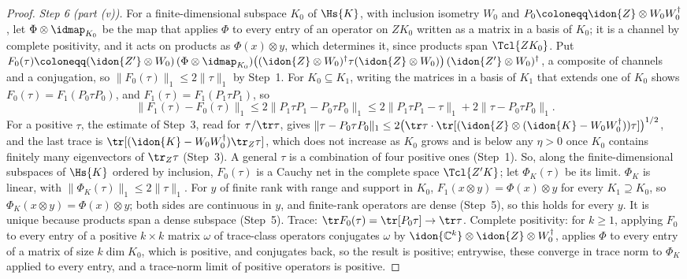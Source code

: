 \begin{proof}
\emph{Step 6 (part (v)).} For a finite-dimensional subspace $K_0$ of
$\Hs{K}$, with inclusion isometry $W_0$ and $P_0\coloneqq\idon{Z}\otimes
W_0W_0^{\dagger}$, let $\Phi\otimes\idmap_{K_0}$ be the map that applies
$\Phi$ to every entry of an operator on $ZK_0$ written as a matrix in a basis
of $K_0$; it is a channel by complete positivity, and it acts on products as
$\Phi(x)\otimes y$, which determines it, since products span $\Tcl{ZK_0}$.
Put $F_0(\tau)\coloneqq(\idon{Z'}\otimes W_0)\,(\Phi\otimes\idmap_{K_0})
\big((\idon{Z}\otimes W_0)^{\dagger}\tau(\idon{Z}\otimes W_0)\big)\,
(\idon{Z'}\otimes W_0)^{\dagger}$, a composite of channels and a
conjugation, so $\|F_0(\tau)\|_1\le2\|\tau\|_1$ by Step~1. For
$K_0\subseteq K_1$, writing the matrices in a basis of $K_1$ that extends one
of $K_0$ shows $F_0(\tau)=F_1(P_0\tau P_0)$, and $F_1(\tau)=F_1(P_1\tau P_1)$,
so
\begin{equation*}
  \|F_1(\tau)-F_0(\tau)\|_1\le2\|P_1\tau P_1-P_0\tau P_0\|_1
  \le2\|P_1\tau P_1-\tau\|_1+2\|\tau-P_0\tau P_0\|_1 .
\end{equation*}
For a positive $\tau$, the estimate of Step~3, read for $\tau/\tr\tau$, gives
$\|\tau-P_0\tau P_0\|_1\le2\big(\tr\tau\cdot
\tr[(\idon{Z}\otimes(\idon{K}-W_0W_0^{\dagger}))\tau]\big)^{1/2}$, and the last
trace is $\tr[(\idon{K}-W_0W_0^{\dagger})\tr_Z\tau]$, which does not increase
as $K_0$ grows and is below any $\eta>0$ once $K_0$ contains finitely many
eigenvectors of $\tr_Z\tau$ (Step~3). A general $\tau$ is a combination of
four positive ones (Step~1). So, along the finite-dimensional subspaces of
$\Hs{K}$ ordered by inclusion, $F_0(\tau)$ is a Cauchy net in the complete
space $\Tcl{Z'K}$; let $\Phi_K(\tau)$ be its limit. $\Phi_K$ is linear, with
$\|\Phi_K(\tau)\|_1\le2\|\tau\|_1$. For $y$ of finite rank with range and
support in $K_0$, $F_1(x\otimes y)=\Phi(x)\otimes y$ for every $K_1\supseteq
K_0$, so $\Phi_K(x\otimes y)=\Phi(x)\otimes y$; both sides are continuous in
$y$, and finite-rank operators are dense (Step~5), so this holds for every
$y$. It is unique because products span a dense subspace (Step~5). Trace:
$\tr F_0(\tau)=\tr[P_0\tau]\to\tr\tau$. Complete positivity: for $k\ge1$,
applying $F_0$ to every entry of a positive $k\times k$ matrix $\omega$ of
trace-class operators conjugates $\omega$ by $\idon{\mathbb{C}^k}\otimes
\idon{Z}\otimes W_0^{\dagger}$, applies $\Phi$ to every entry of a matrix of
size $k\dim K_0$, which is positive, and conjugates back, so the result is
positive; entrywise, these converge in trace norm to $\Phi_K$ applied to every
entry, and a trace-norm limit of positive operators is positive.
\end{proof}
